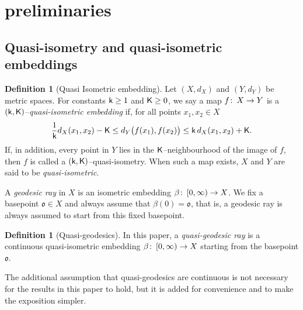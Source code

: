 \documentclass[12 pt]{amsart}
\newcommand{\gothic}{\mathfrak}
\newcommand{\go}{{\gothic o}}
\theoremstyle{definition}
\newtheorem{definition}[theorem]{Definition}
\theoremstyle{remark}
\newcommand{\sK}{{\sf K}}
\newcommand{\kk}{{\sf k}}
\newcommand{\from}{\colon\thinspace}
\begin{document}
\section{preliminaries}

\subsection{Quasi-isometry and quasi-isometric embeddings}

\begin{definition}[Quasi Isometric embedding] \label{Def:Quasi-Isometry} 
Let $(X , d_X)$ and $(Y , d_Y)$ be metric spaces. For constants $\kk \geq 1$ and
$\sK \geq 0$, we say a map $f \from X \to Y$ is a 
$(\kk, \sK)$--\textit{quasi-isometric embedding} if, for all points $x_1, x_2 \in X$
$$
\frac{1}{\kk} d_X (x_1, x_2) - \sK  \leq d_Y \big(f (x_1), f (x_2)\big) 
   \leq \kk \, d_X (x_1, x_2) + \sK.
$$
If, in addition, every point in $Y$ lies in the $\sK$--neighbourhood of the image of 
$f$, then $f$ is called a $(\kk, \sK)$--quasi-isometry. When such a map exists, $X$ 
and $Y$ are said to be \textit{quasi-isometric}. 

\end{definition}


A \emph{geodesic ray} in $X$ is an isometric embedding $\beta \from [0, \infty) \to X$. We fix a basepoint $\go \in X$ and always assume 
that $\beta(0) = \go$, that is, a geodesic ray is always assumed to start from 
this fixed basepoint. 
\begin{definition}[Quasi-geodesics] \label{Def:Quadi-Geodesic} 
In this paper, a \emph{quasi-geodesic ray} is a continuous quasi-isometric 
embedding $\beta \from [0, \infty) \to X$  starting from the basepoint $\go$. 
\end{definition}
The additional assumption that quasi-geodesics are continuous is not necessary for the results in this paper to hold,
but it is added for convenience and to make the exposition simpler. 
\end{document}
